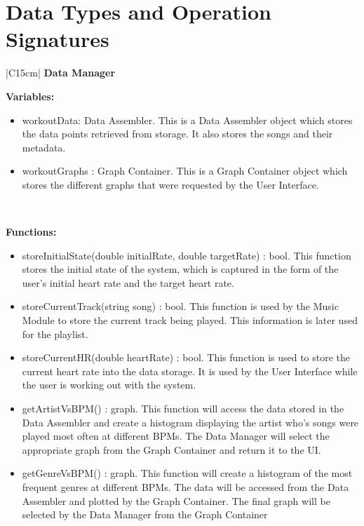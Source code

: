 \documentclass[letterpaper,english, 12pt]{scrreprt}
\begin{document}
\section{Data Types and Operation Signatures}
\begin{center}
	\begin{tabular}{|C{15cm}|}
		\hline
			\textbf{Data Manager}\\
		\hline
			\begin{flushleft}
				\textbf{Variables:} \\
			\end{flushleft}
				\begin{itemize}
					\item workoutData: Data Assembler. This is a Data Assembler object which stores the data points retrieved from storage. It also stores the songs and their metadata.
					\item workoutGraphs : Graph Container. This is a Graph Container object which stores the different graphs that were requested by the User Interface.
				\end{itemize} \\
			\hline
			\begin{flushleft}
				\textbf{Functions:} \\
			\end{flushleft}
				\begin{itemize}
					\item storeInitialState(double initialRate, double targetRate) : bool. This function stores the initial state of the system, which is captured in the form of the user's initial heart rate and the target heart rate.
					\item storeCurrentTrack(string song) : bool. This function is used by the Music Module to store the current track being played. This information is later used for the playlist.
					\item storeCurrentHR(double heartRate) : bool. This function is used to store the current heart rate into the data storage. It is used by the User Interface while the user is working out with the system.
					\item getArtistVsBPM() : graph. This function will access the data stored in the Data Assembler and create a histogram displaying the artist who's songs were played most often at different BPMs. The Data Manager will select the appropriate graph from the Graph Container and return it to the UI.
					\item getGenreVsBPM() : graph. This function will create a histogram of the most frequent genres at different BPMs. The data will be accessed from the Data Assembler and plotted by the Graph Container. The final graph will be selected by the Data Manager from the Graph Container

\end{itemize}
\end{tabular}
\end{center}
\end{document}
